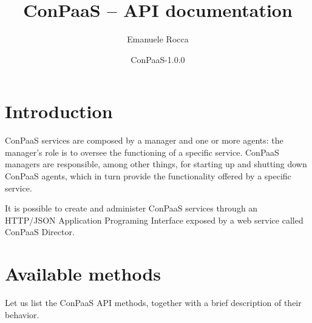 \documentclass[10pt]{article}
\title{ConPaaS -- API documentation\htmlonly{ [\xml{a href="api.pdf"}pdf\xml{/a}]}}
\author{Emanuele Rocca}
\date{ConPaaS-1.0.0}
\begin{document}
\maketitle


\section{Introduction}
\label{intro}
ConPaaS services are composed by a manager and one or more agents: the
manager's role is to oversee the functioning of a specific service. ConPaaS
managers are responsible, among other things, for starting up and shutting down
ConPaaS agents, which in turn provide the functionality offered by a specific
service.

It is possible to create and administer ConPaaS services through an HTTP/JSON
Application Programing Interface exposed by a web service called ConPaaS
Director. 

\pagebreak 

\section{Available methods}
Let us list the ConPaaS API methods, together with a brief description of their
behavior.
\end{document}
